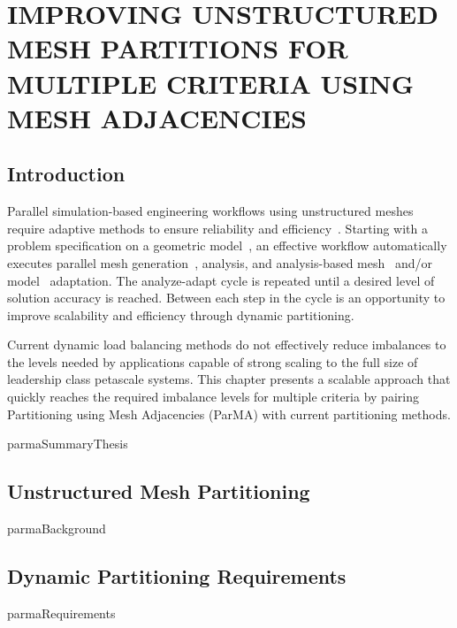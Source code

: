 \chapter{IMPROVING UNSTRUCTURED MESH PARTITIONS FOR MULTIPLE CRITERIA USING MESH
ADJACENCIES}
\label{chp:ptnImprovement}

\section{Introduction}
Parallel simulation-based engineering workflows using unstructured meshes
require adaptive methods to ensure reliability and
efficiency~\cite{shephard2013bringing}.
Starting with a problem specification on a geometric model~\cite{OBaBea,SheBea},
an effective workflow automatically executes parallel mesh
generation~\cite{tendulkar2011parallel}, analysis, and analysis-based
mesh~\cite{chitale2014anisotropic,Sahn06} and/or
model~\cite{ramm2003error} adaptation.
The analyze-adapt cycle is repeated until a desired level of solution accuracy
is reached.
Between each step in the cycle is an opportunity to improve scalability and
efficiency through dynamic partitioning.

Current dynamic load balancing methods do not effectively reduce imbalances to
the levels needed by applications capable of strong scaling to the full size of
leadership class petascale systems.
This chapter presents a scalable approach that quickly reaches the required
imbalance levels for multiple criteria by pairing Partitioning using Mesh
Adjacencies (ParMA) with current partitioning methods.

{parmaSummaryThesis}

\section{Unstructured Mesh Partitioning} \label{sec:partitioning}
{parmaBackground}

\section{Dynamic Partitioning Requirements} \label{sec:requirements}
{parmaRequirements}

